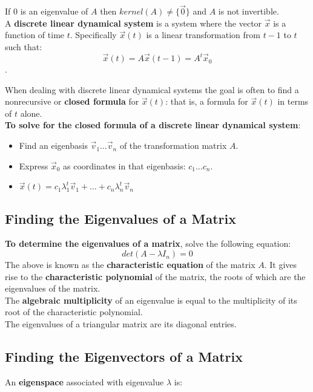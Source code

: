 \documentclass[]{scrartcl}
\begin{document}
	If 0 is an eigenvalue of $A$ then $kernel(A) \neq \{\vec{0}\}$ and $A$ is not invertible.\\
	
	A \textbf{discrete linear dynamical system} is a system where the vector $\vec{x}$ is a function of time $t$. Specifically $\vec{x}(t)$ is a linear transformation from $t-1$ to $t$ such that:
	$$\vec{x}(t) = A\vec{x}(t-1) = A^t\vec{x}_0$$.
	
	When dealing with discrete linear dynamical systems the goal is often to find a nonrecursive or \textbf{closed formula} for $\vec{x}(t)$: that is, a formula for $\vec{x}(t)$ in terms of $t$ alone.\\
	
	\textbf{To solve for the closed formula of a discrete linear dynamical system}:
	\begin{itemize}
		\item Find an eigenbasis $\vec{v}_1 \ldots \vec{v}_n$ of the transformation matrix $A$.
		\item Express $\vec{x}_0$ as coordinates in that eigenbasis: $c_1 \ldots c_n$.
		\item $\vec{x}(t) = c_1 \lambda_1^t \vec{v}_1 + \ldots + c_n \lambda_n^t \vec{v}_n$
	\end{itemize}
	
	\subsection{Finding the Eigenvalues of a Matrix}
	
	\textbf{To determine the eigenvalues of a matrix}, solve the following equation:
	$$ det(A - \lambda I_n) = 0 $$
	The above is known as the \textbf{characteristic equation} of the matrix $A$. It gives rise to the \textbf{characteristic polynomial} of the matrix, the roots of which are the eigenvalues of the matrix.\\
	
	The \textbf{algebraic multiplicity} of an eigenvalue is equal to the multiplicity of its root of the characteristic polynomial.\\
	
	The eigenvalues of a triangular matrix are its diagonal entries.\\
	
	\subsection{Finding the Eigenvectors of a Matrix}
	An \textbf{eigenspace} associated with eigenvalue $\lambda$ is:
	
\end{document}
